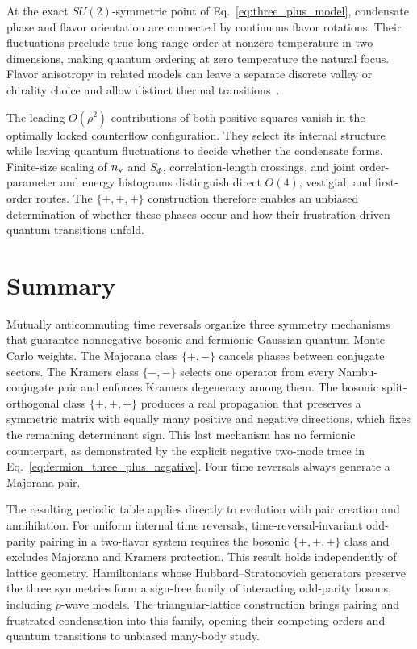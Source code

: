 \documentclass[onecolumn,aps,prb,amsmath,amssymb,superscriptaddress,longbibliography]{revtex4-2}
\begin{document}
At the exact \(SU(2)\)-symmetric point of Eq.~\eqref{eq:three_plus_model}, condensate phase and flavor orientation are connected by continuous flavor rotations.  Their fluctuations preclude true long-range order at nonzero temperature in two dimensions, making quantum ordering at zero temperature the natural focus.  Flavor anisotropy in related models can leave a separate discrete valley or chirality choice and allow distinct thermal transitions~\cite{liParamekantiHemmerich2014chiral,yuWuZhang2025vestigial}.

The leading \(O(\rho^2)\) contributions of both positive squares vanish in the optimally locked counterflow configuration.  They select its internal structure while leaving quantum fluctuations to decide whether the condensate forms.  Finite-size scaling of \(n_{\rm v}\) and \(S_\Phi\), correlation-length crossings, and joint order-parameter and energy histograms distinguish direct \(O(4)\), vestigial, and first-order routes.  The \(\{+,+,+\}\) construction therefore enables an unbiased determination of whether these phases occur and how their frustration-driven quantum transitions unfold.

\section{Summary}

Mutually anticommuting time reversals organize three symmetry mechanisms that guarantee nonnegative bosonic and fermionic Gaussian quantum Monte Carlo weights.  The Majorana class \(\{+,-\}\) cancels phases between conjugate sectors.  The Kramers class \(\{-,-\}\) selects one operator from every Nambu-conjugate pair and enforces Kramers degeneracy among them.  The bosonic split-orthogonal class \(\{+,+,+\}\) produces a real propagation that preserves a symmetric matrix with equally many positive and negative directions, which fixes the remaining determinant sign.  This last mechanism has no fermionic counterpart, as demonstrated by the explicit negative two-mode trace in Eq.~\eqref{eq:fermion_three_plus_negative}.  Four time reversals always generate a Majorana pair.

The resulting periodic table applies directly to evolution with pair creation and annihilation.  For uniform internal time reversals, time-reversal-invariant odd-parity pairing in a two-flavor system requires the bosonic \(\{+,+,+\}\) class and excludes Majorana and Kramers protection.  This result holds independently of lattice geometry.  Hamiltonians whose Hubbard--Stratonovich generators preserve the three symmetries form a sign-free family of interacting odd-parity bosons, including \(p\)-wave models.  The triangular-lattice construction brings pairing and frustrated condensation into this family, opening their competing orders and quantum transitions to unbiased many-body study.
\end{document}
